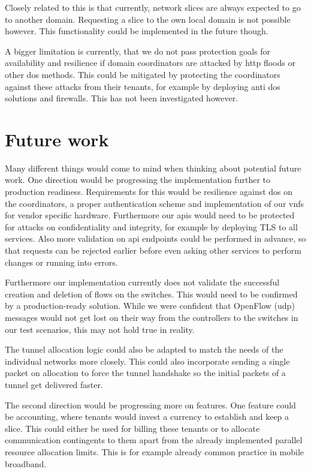 Closely related to this is that currently, network slices are always expected to go to another domain. Requesting a slice to the own local domain is not possible however. This functionality could be implemented in the future though.

A bigger limitation is currently, that we do not pass protection goals for availability and resilience if domain coordinators are attacked by \acrshort{http} floods or other \acrshort{dos} methods. This could be mitigated by protecting the coordinators against these attacks from their tenants, for example by deploying anti \acrshort{dos} solutions and firewalls. This has not been investigated however.

\section{Future work}
Many different things would come to mind when thinking about potential future work. One direction would be progressing the implementation further to production readiness. Requirements for this would be resilience against \acrshort{dos} on the coordinators, a proper authentication scheme and implementation of our \acrshort{vnf}s for vendor specific hardware. Furthermore our \acrshort{api}s would need to be protected for attacks on confidentiality and integrity, for example by deploying TLS to all services. Also more validation on \acrshort{api} endpoints could be performed in advance, so that requests can be rejected earlier before even asking other services to perform changes or running into errors.

Furthermore our implementation currently does not validate the successful creation and deletion of flows on the switches. This would need to be confirmed by a production-ready solution. While we were confident that OpenFlow (\acrshort{udp}) messages would not get lost on their way from the controllers to the switches in our test scenarios, this may not hold true in reality.

The tunnel allocation logic could also be adapted to match the needs of the individual networks more closely. This could also incorporate sending a single packet on allocation to force the tunnel handshake so the initial packets of a tunnel get delivered faster.

The second direction would be progressing more on features. One feature could be accounting, where tenants would invest a currency to establish and keep a slice. This could either be used for billing these tenants or to allocate communication contingents to them apart from the already implemented parallel resource allocation limits. This is for example already common practice in mobile broadband.


